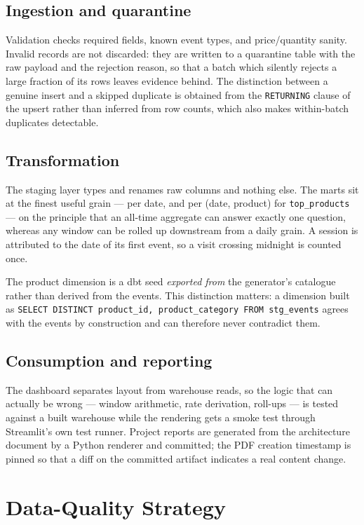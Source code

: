 \documentclass[conference]{IEEEtran}
\begin{document}
\subsection{Ingestion and quarantine}
Validation checks required fields, known event types, and price/quantity
sanity. Invalid records are not discarded: they are written to a quarantine
table with the raw payload and the rejection reason, so that a batch which
silently rejects a large fraction of its rows leaves evidence behind. The
distinction between a genuine insert and a skipped duplicate is obtained from
the \texttt{RETURNING} clause of the upsert rather than inferred from row
counts, which also makes within-batch duplicates detectable.

\subsection{Transformation}
The staging layer types and renames raw columns and nothing else. The marts sit
at the finest useful grain --- per date, and per (date, product) for
\texttt{top\_products} --- on the principle that an all-time aggregate can
answer exactly one question, whereas any window can be rolled up downstream
from a daily grain. A session is attributed to the date of its first event, so
a visit crossing midnight is counted once.

The product dimension is a dbt seed \emph{exported from} the generator's
catalogue rather than derived from the events. This distinction matters: a
dimension built as \texttt{SELECT DISTINCT product\_id, product\_category FROM
stg\_events} agrees with the events by construction and can therefore never
contradict them.

\subsection{Consumption and reporting}
The dashboard separates layout from warehouse reads, so the logic that can
actually be wrong --- window arithmetic, rate derivation, roll-ups --- is
tested against a built warehouse while the rendering gets a smoke test through
Streamlit's own test runner. Project reports are generated from the
architecture document by a Python renderer and committed; the PDF creation
timestamp is pinned so that a diff on the committed artifact indicates a real
content change.

\section{Data-Quality Strategy}
\label{sec:dq}
\end{document}
